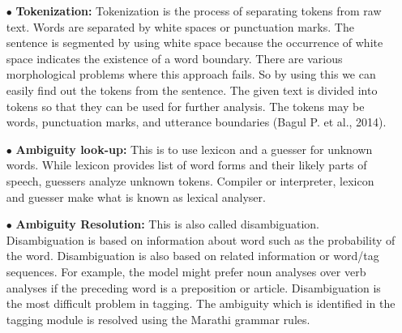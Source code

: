\documentclass[12pt,a4paper,oneside]{memoir}
\begin{document}
\begin{itemize}
  \item[$\bullet$] \textbf{Tokenization:} Tokenization is the process of separating tokens from raw text. Words are separated by white spaces or punctuation marks. The sentence is segmented by using white space because the occurrence of white space indicates the existence of a word boundary. There are various morphological problems where this approach fails. So by using this we can easily find out the tokens from the sentence. The given text is divided into tokens so that they can be used for further analysis. The tokens may be words, punctuation marks, and utterance boundaries (Bagul P. et al., 2014).

  \item[$\bullet$] \textbf{Ambiguity look-up:} This is to use lexicon and a guesser for unknown words. While lexicon provides list of word forms and their likely parts of speech, guessers analyze unknown tokens. Compiler or interpreter, lexicon and guesser make what is known as lexical analyser.

  \item[$\bullet$] \textbf{Ambiguity Resolution:} This is also called disambiguation. Disambiguation is based on information about word such as the probability of the word. Disambiguation is also based on related information or word/tag sequences. For example, the model might prefer noun analyses over verb analyses if the preceding word is a preposition or article. Disambiguation is the most difficult problem in tagging. The ambiguity which is identified in the tagging module is resolved using the Marathi grammar rules. 


\end{itemize}
\end{document}
